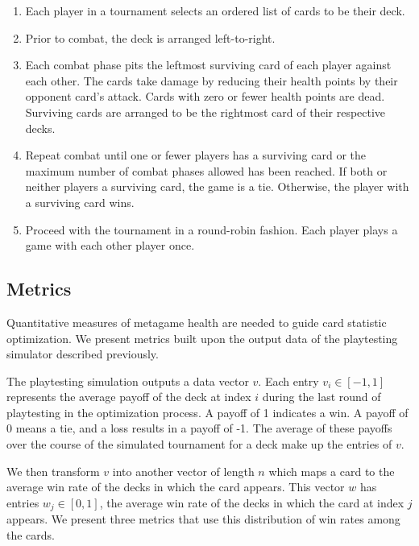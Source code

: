 \begin{enumerate}
	\item Each player in a tournament selects an ordered list
	of cards to be their deck.
	\item Prior to combat, the deck is arranged left-to-right.
	\item Each combat phase pits the leftmost surviving card
	of each player against each other. The cards take damage by 
	reducing their health points by their opponent card's attack.
	Cards with zero or fewer health points are dead. Surviving cards
	are arranged to be the rightmost card of their respective decks.
	\item Repeat combat until one or fewer players has a surviving card
	or the maximum number of combat phases allowed has been reached.
	If both or neither players a surviving card, the game is a tie.
	Otherwise, the player with a surviving card wins.
	\item Proceed with the tournament in a round-robin fashion. Each 
	player plays a game with each other player once.
\end{enumerate}

\subsection{Metrics}

Quantitative measures of metagame health are needed to guide 
card statistic optimization. We present metrics built upon the
output data of the playtesting simulator described previously.

The playtesting simulation outputs a data vector $v$.
Each entry $v_i \in [-1, 1]$ represents the average payoff of
the deck at index $i$ during the last round of playtesting in
the optimization process. A payoff of 1 indicates a win. A
payoff of 0 means a tie, and a loss results in a payoff of -1.
The average of these payoffs over the course of the simulated
tournament for a deck make up the entries of $v$.

We then transform $v$ into another vector of length $n$ which maps a card to the
average win rate of the decks in which the card appears. This
vector $w$ has entries
$w_j \in [0, 1]$, the average win rate of the decks in which
the card at index $j$ appears. We present three metrics that 
use this distribution of win rates among the cards.

